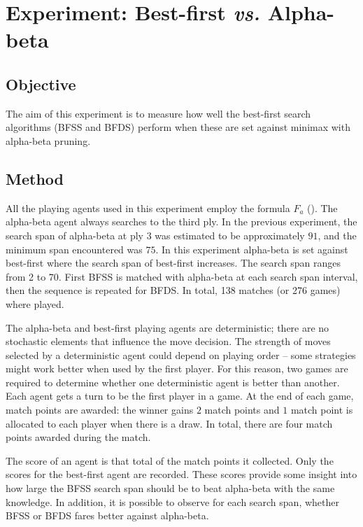 \section{Experiment: Best-first {\it vs.} Alpha-beta}
\label{sec:tree-exp-bfss-ab}
\subsection*{Objective}
The aim of this experiment is to measure how well the best-first search algorithms (BFSS and BFDS) perform when these are set against minimax with alpha-beta pruning.   
\subsection*{Method}

All the playing agents used in this experiment employ the formula $F_a$ ().  The alpha-beta agent always searches to the third ply.  In the previous experiment, the search span of alpha-beta at ply 3 was estimated to be approximately $91$, and the minimum span encountered was $75$.  In this experiment alpha-beta is set against best-first where the search span of best-first increases.  The search span ranges from 2 to 70. First BFSS is matched with  alpha-beta at each search span interval, then the sequence is repeated for BFDS.  In total, 138 matches (or 276 games) where played.

The alpha-beta and best-first playing agents are deterministic; there are no stochastic elements that influence the move decision. The strength of moves selected by a deterministic agent could depend on playing order -- some strategies might work better when used by the first player.  For this reason, two games are required to determine whether one deterministic agent is better than another. Each agent gets a turn to be the first player in a  game. At the end of each game, match points are awarded: the winner gains $2$ match points and $1$ match point is allocated to each player when there is a draw. In total, there are four match points awarded during the match.  

The score of an agent is that total of the match points it collected.  Only the scores for the best-first agent are recorded.  These scores provide some insight into how large the BFSS search span should be to beat alpha-beta with the same knowledge. In addition, it is possible to observe for each search span, whether BFSS or BFDS fares better against alpha-beta.
  

